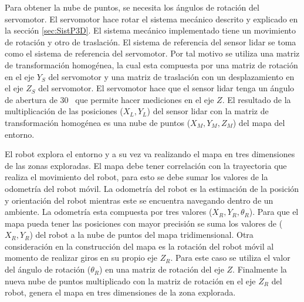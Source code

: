Para obtener la nube de puntos, se necesita los ángulos de rotación del servomotor. El 
servomotor hace rotar el sistema mecánico descrito y explicado en la sección 
\ref{sec:SistP3D}. El sistema mecánico implementado tiene un movimiento de rotación y otro 
de traslación. El sistema de referencia del sensor lidar se toma como el 
sistema de referencia del servomotor. Por tal motivo se utiliza una matriz de transformación 
homogénea, la cual esta compuesta por una matriz de rotación en el eje $Y_{S}$ del servomotor 
y una matriz de traslación con un desplazamiento en el eje $Z_{S}$ del servomotor. El
servomotor hace que el sensor lidar tenga un ángulo de abertura de 30\grad~ que permite
hacer mediciones en el eje $Z$. El resultado de la multiplicación de las posiciones 
($X_{L}, Y_{L}$) del sensor lidar con la matriz de transformación homogénea es
una nube de puntos ($X_{M}, Y_{M}, Z_{M}$) del mapa del entorno.

El robot explora el entorno y a su vez va realizando el mapa en tres dimensiones de las zonas
exploradas. El mapa debe tener correlación con la trayectoria que realiza el movimiento del 
robot, para esto se debe sumar los valores de la odometría del robot móvil. La odometría del 
robot es la estimación de la posición y orientación del robot mientras este se encuentra 
navegando dentro de un ambiente. La odometría esta compuesta por tres valores ($X_{R}, Y_{R}, 
\theta_{R}$). Para que el mapa pueda tener las posiciones con mayor precisión se suma los 
valores de ($X_{R}, Y_{R}$) del robot a la nube de puntos del mapa tridimensional. Otra
consideración en la construcción del mapa es la rotación del robot móvil al momento de 
realizar giros en su propio eje $Z_{R}$. Para este caso se utiliza el valor del ángulo 
de rotación ($\theta_{R}$) en una matriz de rotación del eje $Z$. Finalmente la nueva nube 
de puntos multiplicado con la matriz de rotación en el eje $Z_{R}$ del robot, genera el mapa 
en tres dimensiones de la zona explorada.
